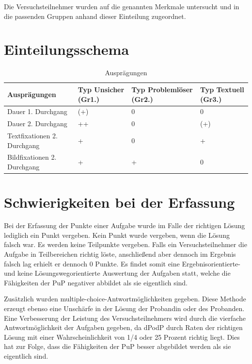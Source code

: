Die Versuchsteilnehmer wurden auf die genannten Merkmale untersucht und in die passenden Gruppen anhand dieser Einteilung zugeordnet.
\section*{Einteilungsschema}

\begin{table}[!h]
\hspace{-5pt}
\begin{tabularx}{\textwidth + 5pt}{| @{\hspace{3pt}} M || @{\hspace{3pt}} M  | @{\hspace{3pt}} M  | @{\hspace{3pt}} M |}
\hline
\textbf{Ausprägungen} & \textbf{Typ Unsicher (Gr1.)} & \textbf{Typ Problemlöser (Gr2.)} & \textbf{Typ Textuell (Gr3.)}\\
\hline
\hline
Dauer 1. Durchgang          & (+) & 0 & 0\\
\hline
Dauer 2. Durchgang          & ++ & 0 & (+)\\
\hline
Textfixationen 2. Durchgang & + & 0 & +\\
\hline
Bildfixationen 2. Durchgang & + & + & 0\\
\hline
\end{tabularx}
\caption{Ausprägungen}
\end{table}



\section{Schwierigkeiten bei der Erfassung}

Bei der Erfassung der Punkte einer Aufgabe wurde im Falle der richtigen Lösung lediglich ein Punkt vergeben. Kein Punkt wurde vergeben, wenn die Lösung falsch war. Es werden keine Teilpunkte vergeben. Falls ein Versuchsteilnehmer die Aufgabe in Teilbereichen richtig löste, anschließend aber dennoch im Ergebnis falsch lag erhielt er dennoch 0 Punkte. Es findet somit eine Ergebnisorientierte- und keine Lösungswegorientierte Auswertung der Aufgaben statt, welche die Fähigkeiten der \gls{PuP} negativer abbildet als sie eigentlich sind.

Zusätzlich wurden multiple-choice-Antwortmöglichkeiten gegeben. Diese Methode erzeugt ebenso eine Unschärfe in der Lösung der Probandin oder des Probanden. Eine Verbesserung der Leistung des Versuchsteilnehmers wird durch die vierfache Antwortmöglichkeit der Aufgaben gegeben, da \gls{dPodP} durch Raten der richtigen Lösung mit einer Wahrscheinlichkeit von 1/4 oder 25 Prozent richtig liegt. Dies hat zur Folge, dass die Fähigkeiten der \gls{PuP} besser abgebildet werden als sie eigentlich sind.  

